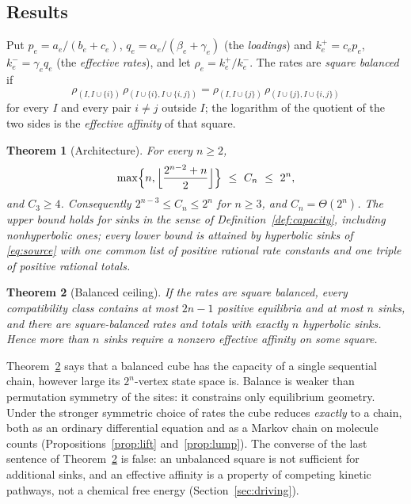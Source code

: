 \documentclass[11pt]{article}
\theoremstyle{plain}
\newtheorem{theorem}{Theorem}[section]
\theoremstyle{definition}
\theoremstyle{remark}
\numberwithin{equation}{section}
\begin{document}
\subsection{Results}
Put \(p_e=a_e/(b_e+c_e)\), \(q_e=\alpha_e/(\beta_e+\gamma_e)\) (the \emph{loadings}) and
\(k_e^+=c_ep_e\), \(k_e^-=\gamma_eq_e\) (the \emph{effective rates}), and let
\(\rho_e=k_e^+/k_e^-\). The rates are \emph{square balanced} if
\begin{equation}\label{eq:balance-intro}
 \rho_{(I,I\cup\{i\})}\,\rho_{(I\cup\{i\},I\cup\{i,j\})}
 =\rho_{(I,I\cup\{j\})}\,\rho_{(I\cup\{j\},I\cup\{i,j\})}
\end{equation}
for every \(I\) and every pair \(i\ne j\) outside \(I\); the logarithm of the quotient of the
two sides is the \emph{effective affinity} of that square.

\begin{theorem}[Architecture]\label{thm:capacity}
For every \(n\ge2\),
\[
 \max\Bigl\{n,\Bigl\lfloor\frac{2^{n-2}+n}{2}\Bigr\rfloor\Bigr\}\ \le\ C_n\ \le\ 2^n ,
\]
and \(C_3\ge4\). Consequently \(2^{n-3}\le C_n\le2^n\) for \(n\ge3\), and \(C_n=\Theta(2^n)\).
The upper bound holds for sinks in the sense of Definition~\textup{\ref{def:capacity}},
including nonhyperbolic ones; every lower bound is attained by hyperbolic sinks of
\eqref{eq:source} with one common list of positive rational rate constants and one triple of
positive rational totals.
\end{theorem}

\begin{theorem}[Balanced ceiling]\label{thm:balanced}
If the rates are square balanced, every compatibility class contains at most \(2n-1\) positive
equilibria and at most \(n\) sinks, and there are square-balanced rates and totals with exactly
\(n\) hyperbolic sinks. Hence more than \(n\) sinks require a nonzero effective affinity on
some square.
\end{theorem}

Theorem~\ref{thm:balanced} says that a balanced cube has the capacity of a single sequential
chain, however large its \(2^n\)-vertex state space is. Balance is weaker than permutation
symmetry of the sites: it constrains only equilibrium geometry. Under the stronger symmetric
choice of rates the cube reduces \emph{exactly} to a chain, both as an ordinary differential
equation and as a Markov chain on molecule counts (Propositions~\ref{prop:lift}
and~\ref{prop:lump}). The converse of the last sentence of Theorem~\ref{thm:balanced} is
false: an unbalanced square is not sufficient for additional sinks, and an effective affinity
is a property of competing kinetic pathways, not a chemical free energy
(Section~\ref{sec:driving}).
\end{document}
